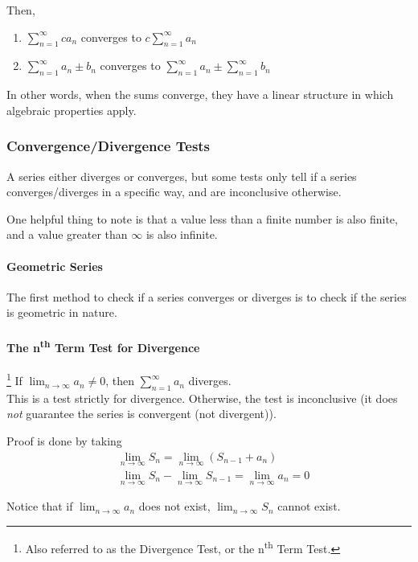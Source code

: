 \documentclass{article}
\begin{document}
Then,
\begin{enumerate}
    \item $\sum_{n=1}^{\infty} ca_n$ converges to $c\sum_{n=1}^{\infty} a_n$
    \item $\sum_{n=1}^{\infty} a_n \pm b_n$ converges to $\sum_{n=1}^{\infty} a_n \pm \sum_{n=1}^{\infty} b_n$
\end{enumerate}

In other words, when the sums converge, they have a linear structure in which algebraic properties apply.

\subsubsection{Convergence/Divergence Tests}
A series either diverges or converges, but some tests only tell if a series converges/diverges in a specific way, and are inconclusive otherwise.

One helpful thing to note is that a value less than a finite number is also finite, and a value greater than $\infty$ is also infinite.

\paragraph{Geometric Series} The first method to check if a series converges or diverges is to check if the series is geometric in nature.

\paragraph{The n\textsuperscript{th} Term Test for Divergence}\footnote{Also referred to as the Divergence Test, or the n\textsuperscript{th} Term Test.} If $\lim_{n \to \infty} a_n \ne 0$, then $\sum_{n=1}^{\infty} a_n$ diverges.\\
This is a test strictly for divergence. Otherwise, the test is inconclusive (it does \emph{not} guarantee the series is convergent (not divergent)).

Proof is done by taking
\begin{align*}
    &\lim_{n\to \infty} S_n = \lim_{n\to \infty} \left( S_{n-1} + a_{n} \right) \\
    &\lim_{n\to \infty} S_n - \lim_{n\to \infty} S_{n-1} = \lim_{n\to \infty} a_n = 0
\end{align*}

Notice that if $\lim_{n\to \infty} a_n$ does not exist, $\lim_{n\to \infty} S_n$ cannot exist.
\end{document}
